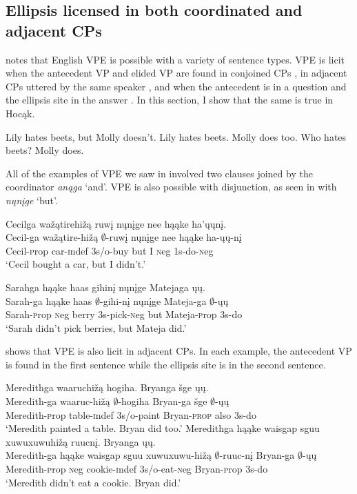 \documentclass[output=paper]{LSP/langsci}
\begin{document}
\subsection{Ellipsis licensed in both coordinated and adjacent CPs}\label{sec:johnson:3.1}

\citet{Goldberg2005} notes that English VPE is possible with a variety of sentence types. VPE is licit when the antecedent VP and elided VP are found in conjoined CPs , in adjacent CPs uttered by the same speaker , and when the antecedent is in a question and the ellipsis site in the answer . In this section, I show that the same is true in Hocąk.

\ea\label{ex:johnson:25}
\ea\label{ex:johnson:25a}
Lily hates beets, but Molly doesn't.
\ex\label{ex:johnson:25b}
Lily hates beets. Molly does too.
\ex\label{ex:johnson:25c}
Who hates beets? Molly does.
\z
\z

All of the examples of VPE we saw in  involved two clauses joined by the coordinator \emph{anąga} `and'. VPE is also possible with disjunction, as seen in  with \emph{nųnįge} `but'.

\ea\label{ex:johnson:26}
\ea
\glll Cecilga wažątirehižą ruwį nųnįge nee hąąke ha'ųųnį.\\
Cecil-ga wažątire-hižą $\emptyset$-ruwį nųnįge nee hąąke ha-ųų-nį\\
Cecil-{\textsc prop} car-{\textsc indef} {\textsc 3s/o}-buy but I {\textsc neg} {\textsc 1s}-do-{\textsc neg}\\
\trans `Cecil bought a car, but I didn't.'

\ex
\glll Sarahga hąąke haas gihinį nųnįge Matejaga ųų.\\
Sarah-ga hąąke haas $\emptyset$-gihi-nį nųnįge Mateja-ga $\emptyset$-ųų\\
Sarah-{\textsc prop} {\textsc neg} berry {\textsc 3s}-pick-{\textsc neg} but Mateja-{\textsc prop} {\textsc 3s}-do\\
\trans `Sarah didn't pick berries, but Mateja did.'
\z
\z


 shows that VPE is also licit in adjacent CPs. In each example, the antecedent VP is found in the first sentence while the ellipsis site is in the second sentence.

\ea\label{ex:johnson:27}
\ea
\glll Meredithga waaruchižą hogiha. Bryanga šge ųų.\\
Meredith-ga waaruc-hižą $\emptyset$-hogiha Bryan-ga šge $\emptyset$-ųų\\
Meredith-{\textsc prop} table-{\textsc indef} {\textsc 3s/o}-paint Bryan-\textsc{prop} also {\textsc 3s}-do\\
\trans `Meredith painted a table. Bryan did too.'
\ex
\glll Meredithga hąąke {waisgap sguu xuwuxuwuhižą} ruucnį. Bryanga ųų.\\
Meredith-ga hąąke {waisgap sguu xuwuxuwu-hižą} $\emptyset$-ruuc-nį Bryan-ga $\emptyset$-ųų\\
Meredith-{\textsc prop} {\textsc neg} cookie-{\textsc indef} {\textsc 3s/o}-eat-{\textsc neg} Bryan-{\textsc prop} {\textsc 3s}-do\\
\trans `Meredith didn't eat a cookie. Bryan did.'
\z
\z
\end{document}
